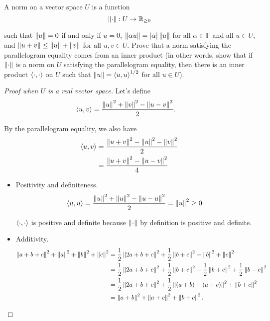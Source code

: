 \begin{exercise}
    A norm on a vector space $U$ is a function
    \[
        \left\Vert{\cdot}\right\Vert: U\to \mathbb{R}_{\geq 0}
    \]

    such that $\left\Vert{u}\right\Vert = 0$ if and only if $u = 0$, $\left\Vert{\alpha u}\right\Vert = \left\vert{\alpha}\right\vert\left\Vert{u}\right\Vert$ for all $\alpha\in\mathbb{F}$ and all $u\in U$, and $\left\Vert{u + v}\right\Vert\leq \left\Vert{u}\right\Vert + \left\Vert{v}\right\Vert$ for all $u, v\in U$. Prove that a norm satisfying the parallelogram equality comes from an inner product (in other words, show that if $\left\Vert{\cdot}\right\Vert$ is a norm on $U$ satisfying the parallelogram equality, then there is an inner product $\left\langle{\cdot, \cdot}\right\rangle$ on $U$ such that $\left\Vert{u}\right\Vert = {\left\langle{u, u}\right\rangle}^{1/2}$ for all $u \in U$).
\end{exercise}

\begin{proof}[Proof when $U$ is a real vector space]
    Let's define
    \begin{align*}
        \left\langle{u, v}\right\rangle & = \frac{\left\Vert{u}\right\Vert^{2} + \left\Vert{v}\right\Vert^{2} - \left\Vert{u - v}\right\Vert^{2}}{2}.
    \end{align*}

    By the parallelogram equality, we also have
    \begin{align*}
        \left\langle{u,v }\right\rangle & = \frac{\left\Vert{u + v}\right\Vert^{2} - \left\Vert{u}\right\Vert^{2} - \left\Vert{v}\right\Vert^{2}}{2} \\
                         & = \frac{\left\Vert{u + v}\right\Vert^{2} - \left\Vert{u - v}\right\Vert^{2}}{4}
    \end{align*}

    \begin{itemize}
        \item Positivity and definiteness.
              \[
                  \left\langle{u, u}\right\rangle = \frac{\left\Vert{u}\right\Vert^{2} + \left\Vert{u}\right\Vert^{2} - \left\Vert{u - u}\right\Vert^{2}}{2} = \left\Vert{u}\right\Vert^{2}\geq 0.
              \]

              $\left\langle{\cdot, \cdot}\right\rangle$ is positive and definite because $\left\Vert{\cdot}\right\Vert$ by definition is positive and definite.
        \item Additivity.
              \begin{align*}
                  \left\Vert{a + b + c}\right\Vert^{2} + \left\Vert{a}\right\Vert^{2} + \left\Vert{b}\right\Vert^{2} + \left\Vert{c}\right\Vert^{2} & = \frac{1}{2}\left\Vert{2a + b + c}\right\Vert^{2} + \frac{1}{2}\left\Vert{b + c}\right\Vert^{2} + \left\Vert{b}\right\Vert^{2} + \left\Vert{c}\right\Vert^{2}                               \\
                                                                                    & = \frac{1}{2}\left\Vert{2a + b + c}\right\Vert^{2} + \frac{1}{2}\left\Vert{b + c}\right\Vert^{2} + \frac{1}{2}\left\Vert{b + c}\right\Vert^{2} + \frac{1}{2}\left\Vert{b - c}\right\Vert^{2} \\
                                                                                    & = \frac{1}{2}\left\Vert{2a + b + c}\right\Vert^{2} + \frac{1}{2}\left\Vert{(a + b) - (a + c)}\right\Vert^{2} + \left\Vert{b + c}\right\Vert^{2}                              \\
                                                                                    & = \left\Vert{a + b}\right\Vert^{2} + \left\Vert{a + c}\right\Vert^{2} + \left\Vert{b + c}\right\Vert^{2}.
              \end{align*}


\end{itemize}
\end{proof}
